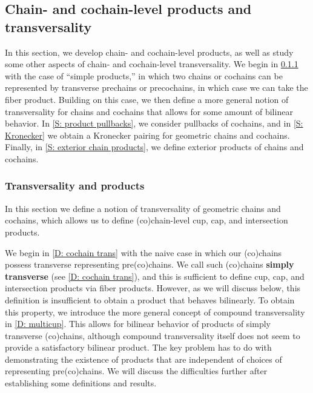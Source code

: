 \subsection{Chain- and cochain-level products and transversality}\label{S: chain products}

In this section, we develop chain- and cochain-level products, as well as study some other aspects of chain- and cochain-level transversality.
We begin in \cref{S: simple products} with the case of ``simple products,'' in which two chains or cochains can be represented by transverse prechains or precochains, in which case we can take the fiber product.
Building on this case, we then define a more general notion of transversality for chains and cochains that allows for some amount of bilinear behavior.
In \cref{S: product pullbacks}, we consider pullbacks of cochains, and in \cref{S: Kronecker} we obtain a Kronecker pairing for geometric chains and cochains.
Finally, in \cref{S: exterior chain products}, we define exterior products of chains and cochains.


\subsubsection{Transversality and products}\label{S: simple products}
In this section we define a notion of transversality of geometric chains and cochains, which allows us to define (co)chain-level cup, cap, and intersection products.

We begin in \cref{D: cochain trans} with the naive case in which our (co)chains possess transverse representing pre(co)chains.
We call such (co)chains \textbf{simply transverse} (see \cref{D: cochain trans}), and this is sufficient to define cup, cap, and intersection products via fiber products.
However, as we will discuss below, this definition is insufficient to obtain a product that behaves bilinearly.
To obtain this property, we introduce the more general concept of compound transversality in \cref{D: multicup}.
This allows for bilinear behavior of products of simply transverse (co)chains, although compound transversality itself does not seem to provide a satisfactory bilinear product.
The key problem has to do with demonstrating the existence of products that are independent of choices of representing pre(co)chains.
We will discuss the difficulties further after establishing some definitions and results.

\begin{comment}
	For example, one might consider the case where $\uV$ and $\uW$ can be represented by disjoint unions of pre(co)chains $V = \bigsqcup V_i$ and $W = \bigsqcup W_j$ such that the pairs $(V_i,W_j)$ are not necessarily transverse but such that for each such pair there are alternative representatives, say $(V'_{ij},W'_{ji})$, depending on both $i$ and $j$, with $\underline{V_i} = \underline{V'_{ij}}$, $\underline{W_j} = \underline{W'_{ji}}$, and $V'_{ij}$ transverse to $W'_{ji}$.
	Then one would like to have products of $\uV$ and $\uW$ using these representatives.
\end{comment}


